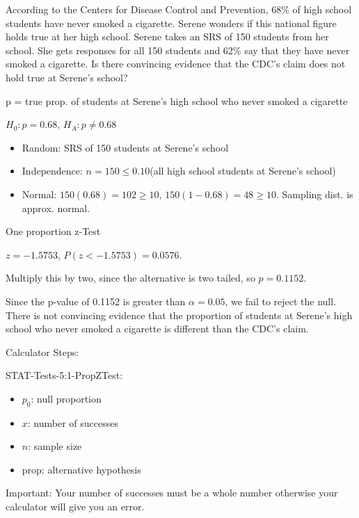 \documentclass[../stats.tex]{subfiles}
\begin{document}
\begin{example}
    According to the Centers for Disease Control and Prevention, 68\% of high school students have never smoked a cigarette. Serene wonders if this national figure holds true at her high school. Serene takes an SRS of 150 students from her school.
    She gets responses for all 150 students and 62\% say that they have never smoked a cigarette. Is there convincing evidence that the CDC's claim does not hold true at Serene's school?

    p = true prop. of students at Serene's high school who never smoked a cigarette

    $H_0: p=0.68$, $H_A: p\neq 0.68$

    \begin{itemize}
        \item Random: SRS of 150 students at Serene's school
        \item Independence: $n=150\leq 0.10$(all high school students at Serene's school)
        \item Normal: $150(0.68)=102\geq 10$, $150(1-0.68)=48\geq 10$. Sampling dist. is approx. normal.
    \end{itemize}

    One proportion z-Test 

    $z=-1.5753$, $P(z<-1.5753)=0.0576$.

    Multiply this by two, since the alternative is two tailed, so $p=0.1152$.

    Since the p-value of 0.1152 is greater than $\alpha=0.05$, we fail to reject the null. There is not convincing evidence that the proportion of students at Serene's high school who never smoked a cigarette is different than the CDC's claim.
\end{example}

Calculator Steps:

STAT-Tests-5:1-PropZTest:
\begin{itemize}
    \item $p_0$: null proportion 
    \item $x$: number of successes
    \item $n$: sample size 
    \item prop: alternative hypothesis
\end{itemize}
Important: Your number of successes must be a whole number otherwise your calculator will give you an error.
\end{document}
